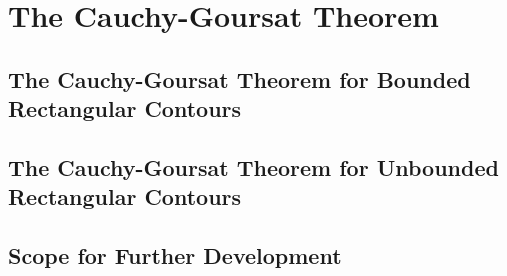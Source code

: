 \section{The Cauchy-Goursat Theorem}

\begin{comment}
Maybe begin with an anecdote - no sooner had we entered Hales's office in Pittsburgh than he asked about how we plan to deform integration contours.

Have 3 subsections.
1. Informal maths
2. Discussion of existing formalisation of closed rectangular case, with emphasis on why we don't have it for other cases (cite Hales's formalisation of the Jordan Curve Theorem in HOL-Light, maybe try and explain why we don't have something similar in Lean)
3. Discussion of our approach to the indefinite case (informally and formally)
Also maybe find better words than closed/open? Because these words are NOT used here in a topological sense, but rather in a very visual sense ("are the two endpoints of the curve the same point or are they not? Does the curve even have two endpoints or does it just have one and then go off to i\infty in the other?")
\end{comment}

\subsection{The Cauchy-Goursat Theorem for Bounded Rectangular Contours}

\subsection{The Cauchy-Goursat Theorem for Unbounded Rectangular Contours}

\subsection{Scope for Further Development}

